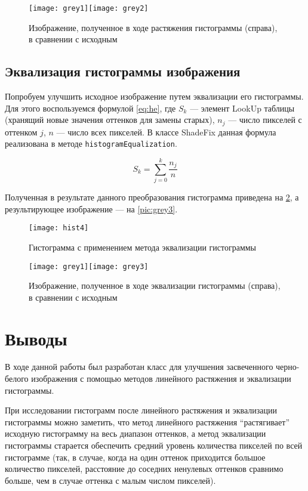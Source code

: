\begin{figure}[H]
	\centering
	\texttt{[image: grey1]}\texttt{[image: grey2]}
	\caption{Изображение, полученное в ходе растяжения гистограммы (справа), в сравнении с исходным}
	\label{pic:grey2}
\end{figure}

\subsection{Эквализация гистограммы изображения}

Попробуем улучшить исходное изображение путем эквализации его гистограммы. Для этого воспользуемся формулой \vref{eq:he}, где $S_k$ --- элемент LookUp таблицы (хранящий новые значения оттенков для замены старых), $n_j$ --- число пикселей с оттенком $j$, $n$ --- число всех пикселей.  В классе ShadeFix данная формула реализована в методе \texttt{histogramEqualization}.

\begin{equation} \label{eq:he}
	S_k=\sum_{j=0}^{k}\frac{n_j}{n}
\end{equation}

Полученная в результате данного преобразования гистограмма приведена на \cref{pic:hist4}, а результирующее изображение --- на \vref{pic:grey3}.

\begin{figure}[H]
	\centering
	\texttt{[image: hist4]}
	\caption{Гистограмма с применением метода эквализации гистограммы}
	\label{pic:hist4}
\end{figure}

\begin{figure}[H]
	\centering
	\texttt{[image: grey1]}\texttt{[image: grey3]}
	\caption{Изображение, полученное в ходе эквализации гистограммы (справа), в сравнении с исходным}
	\label{pic:grey3}
\end{figure}

\section{Выводы}

В ходе данной работы был разработан класс для улучшения засвеченного черно-белого изображения с помощью методов линейного растяжения и эквализации гистограммы.

При исследовании гистограмм после линейного растяжения и эквализации гистограммы можно заметить, что метод линейного растяжения "`растягивает"' исходную гистограмму на весь диапазон оттенков, а метод эквализации гистограммы старается обеспечить средний уровень количества пикселей по всей гистограмме (так, в случае, когда на один оттенок приходится большое количество пикселей, расстояние до соседних ненулевых оттенков сравнимо больше, чем в случае оттенка с малым числом пикселей).

